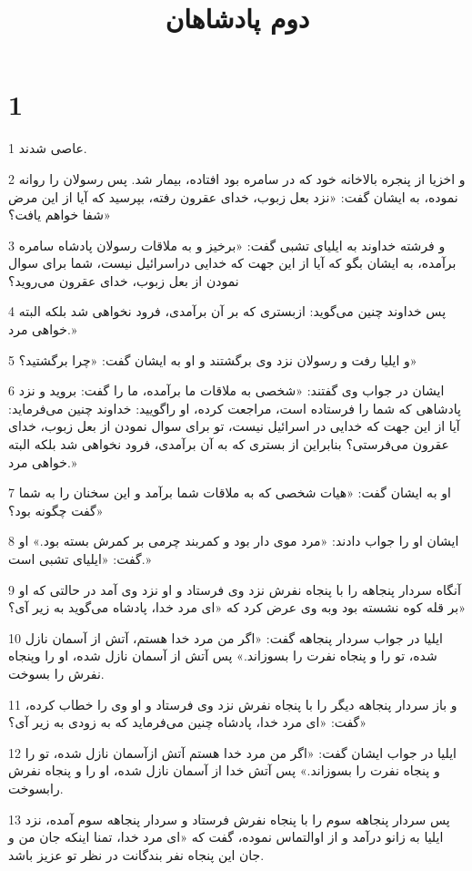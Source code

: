 

\title{دوم پادشاهان}

 
\chapter{1}

\par 1 عاصی شدند.
\par 2 و اخزیا از پنجره بالاخانه خود که در سامره بود افتاده، بیمار شد. پس رسولان را روانه نموده، به ایشان گفت: «نزد بعل زبوب، خدای عقرون رفته، بپرسید که آیا از این مرض شفا خواهم یافت؟»
\par 3 و فرشته خداوند به ایلیای تشبی گفت: «برخیز و به ملاقات رسولان پادشاه سامره برآمده، به ایشان بگو که آیا از این جهت که خدایی دراسرائیل نیست، شما برای سوال نمودن از بعل زبوب، خدای عقرون می‌روید؟
\par 4 پس خداوند چنین می‌گوید: ازبستری که بر آن برآمدی، فرود نخواهی شد بلکه البته خواهی مرد.»
\par 5 و ایلیا رفت و رسولان نزد وی برگشتند و او به ایشان گفت: «چرا برگشتید؟»
\par 6 ایشان در جواب وی گفتند: «شخصی به ملاقات ما برآمده، ما را گفت: بروید و نزد پادشاهی که شما را فرستاده است، مراجعت کرده، او راگویید: خداوند چنین می‌فرماید: آیا از این جهت که خدایی در اسرائیل نیست، تو برای سوال نمودن از بعل زبوب، خدای عقرون می‌فرستی؟ بنابراین از بستری که به آن برآمدی، فرود نخواهی شد بلکه البته خواهی مرد.»
\par 7 او به ایشان گفت: «هیات شخصی که به ملاقات شما برآمد و این سخنان را به شما گفت چگونه بود؟»
\par 8 ایشان او را جواب دادند: «مرد موی دار بود و کمربند چرمی بر کمرش بسته بود.» او گفت: «ایلیای تشبی است.»
\par 9 آنگاه سردار پنجاهه را با پنجاه نفرش نزد وی فرستاد و او نزد وی آمد در حالتی که او بر قله کوه نشسته بود وبه وی عرض کرد که «ای مرد خدا، پادشاه می‌گوید به زیر آی؟»
\par 10 ایلیا در جواب سردار پنجاهه گفت: «اگر من مرد خدا هستم، آتش از آسمان نازل شده، تو را و پنجاه نفرت را بسوزاند.» پس آتش از آسمان نازل شده، او را وپنجاه نفرش را بسوخت.
\par 11 و باز سردار پنجاهه دیگر را با پنجاه نفرش نزد وی فرستاد و او وی را خطاب کرده، گفت: «ای مرد خدا، پادشاه چنین می‌فرماید که به زودی به زیر آی؟»
\par 12 ایلیا در جواب ایشان گفت: «اگر من مرد خدا هستم آتش ازآسمان نازل شده، تو را و پنجاه نفرت را بسوزاند.» پس آتش خدا از آسمان نازل شده، او را و پنجاه نفرش رابسوخت.
\par 13 پس سردار پنجاهه سوم را با پنجاه نفرش فرستاد و سردار پنجاهه سوم آمده، نزد ایلیا به زانو درآمد و از اوالتماس نموده، گفت که «ای مرد خدا، تمنا اینکه جان من و جان این پنجاه نفر بندگانت در نظر تو عزیز باشد.

